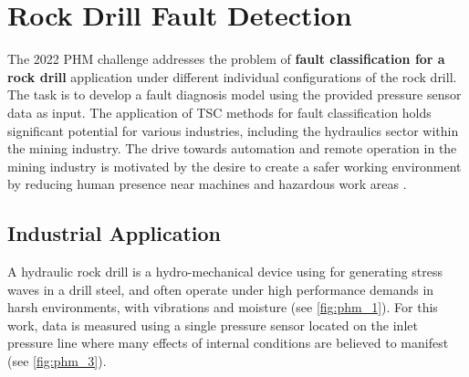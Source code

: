 



\section{Rock Drill Fault Detection}\label{sec:phm_challenge}


The 2022 PHM challenge \cite{phm} addresses the problem of \textbf{fault classification for a rock drill} application under different individual configurations of the rock drill. The task is to develop a fault diagnosis model using the provided pressure sensor data as input. 
The application of TSC methods for fault classification holds significant potential for various industries, including the hydraulics sector within the mining industry. The drive towards automation and remote operation in the mining industry is motivated by the desire to create a safer working environment by reducing human presence near machines and hazardous work areas \cite{jakobsson2022time}.

\subsection{Industrial Application}



A hydraulic rock drill is a hydro-mechanical device using for generating stress waves in a drill steel, and often operate under high performance demands in harsh environments, with vibrations and moisture (see \cref{fig:phm_1}). 
For this work, data is measured using a single pressure sensor located on the inlet pressure line where many effects of internal conditions are believed to manifest (see \cref{fig:phm_3}). 



